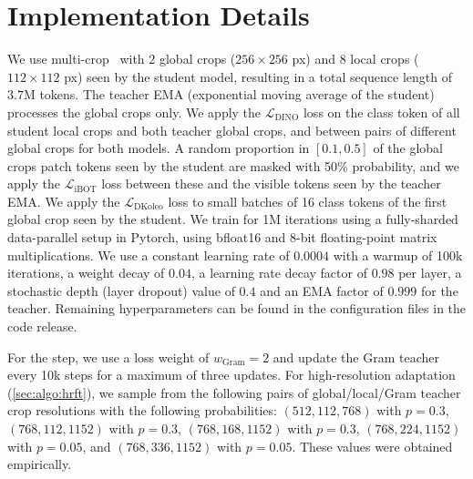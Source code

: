 \section{Implementation Details}
\label{app:implem-details}

We use multi-crop~\citep{caron2020unsupervised} with $2$ global crops ($256\times256$ px) and $8$ local crops ($112\times112$ px) seen by the student model, resulting in a total sequence length of $3.7$M tokens. 
The teacher EMA (exponential moving average of the student) processes the global crops only. We apply the $\mathcal{L_{\mathrm{DINO}}}$ loss on the class token of all student local crops and both teacher global crops, and between pairs of different global crops for both models.
A random proportion in $[0.1, 0.5]$ of the global crops patch tokens seen by the student are masked with 50\% probability, and we apply the $\mathcal{L}_{\mathrm{iBOT}}$ loss between these and the visible tokens seen by the teacher EMA.
We apply the $\mathcal{L}_{\mathrm{DKoleo}}$ loss to small batches of 16 class tokens of the first global crop seen by the student.
We train for 1M iterations using a fully-sharded data-parallel setup in Pytorch, using bfloat16 and 8-bit floating-point matrix multiplications.
We use a constant learning rate of $0.0004$ with a warmup of 100k iterations, a weight decay of $0.04$, a learning rate decay factor of $0.98$ per layer, a stochastic depth (layer dropout) value of $0.4$ and an EMA factor of $0.999$ for the teacher. 
Remaining hyperparameters can be found in the configuration files in the code release.

For the \gramname step, we use a loss weight of $w_{\mathrm{Gram}} = 2$ and update the Gram teacher every 10k steps for a maximum of three updates.
For high-resolution adaptation (\cref{sec:algo:hrft}), we sample from the following pairs of global/local/Gram teacher crop resolutions with the following probabilities: $(512, 112, 768)$ with $p=0.3$, $(768, 112, 1152)$ with $p=0.3$, $(768, 168, 1152)$ with $p=0.3$, $(768, 224, 1152)$ with $p=0.05$, and $(768, 336, 1152)$ with $p=0.05$. 
These values were obtained empirically.
